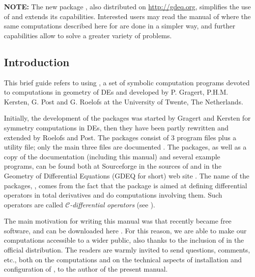   \textbf{NOTE:} The new \REDUCE package  \cite{Vitolo:CDE}, also distributed on
  \url{http://gdeq.org}, simplifies the use of \cdiff and extends its
  capabilities. Interested users may read the manual of  where the same
  computations described here for \cdiff are done in a simpler way, and further
  capabilities allow  to solve a greater variety of problems.


\subsection{Introduction}

This brief guide refers to using \cdiff, a set of symbolic computation programs
devoted to computations in geometry of DEs and developed by P. Gragert,
P.H.M. Kersten, G. Post and G. Roelofs at the University of Twente, The
Netherlands.

Initially, the development of the \cdiff packages was started by Gragert and
Kersten for symmetry computations in DEs, then they have been partly rewritten
and extended by Roelofs and Post. The \cdiff packages consist of 3 program
files plus a utility file; only the main three files are documented
\cite{Roelofs:92,Roelofs:92a,Post:96}. The \cdiff packages, as well as a copy of the
documentation (including this manual) and several example programs, can be
found both at Sourceforge in the sources of \REDUCE \cite{Reduce:Obtaining} and in the
Geometry of Differential Equations (GDEQ for short) web site \cite{gdeq}. The
name of the packages, \cdiff, comes from the fact that the package is aimed at
defining differential operators in total derivatives and do computations
involving them.  Such operators are called \emph{$\mathcal{C}$-differential
  operators} (see \cite{Krasilshchik:99}).

The main motivation for writing this manual was that  recently became
free software, and can be downloaded here \cite{Reduce:Obtaining}. For this reason, we are
able to make our computations accessible to a wider public, also thanks to the
inclusion of \cdiff in the official \REDUCE distribution. The readers are
warmly invited to send questions, comments, etc., both on the computations and
on the technical aspects of installation and configuration of \REDUCE, to the
author of the present manual.

